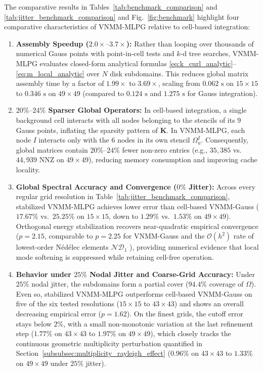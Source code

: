 \documentclass[VANCOUVER,Times1COL]{WileyNJD-v5}
\begin{document}
The comparative results in Tables~\ref{tab:benchmark_comparison} and \ref{tab:jitter_benchmark_comparison} and Fig.~\ref{fig:benchmark} highlight four comparative characteristics of VNMM-MLPG relative to cell-based integration:
\begin{enumerate}
    \item \textbf{Assembly Speedup ($2.0\times\text{--}3.7\times$):} Rather than looping over thousands of numerical Gauss points with point-in-cell tests and $k$-d tree searches, VNMM-MLPG evaluates closed-form analytical formulas \eqref{eq:k_curl_analytic}--\eqref{eq:m_local_analytic} over $N$ disk subdomains. This reduces global matrix assembly time by a factor of $1.99\times$ to $3.69\times$, scaling from $0.062\text{ s}$ on $15 \times 15$ to $0.346\text{ s}$ on $49 \times 49$ (compared to $0.124\text{ s}$ and $1.275\text{ s}$ for Gauss integration).
    \item \textbf{$20\%\text{--}24\%$ Sparser Global Operators:} In cell-based integration, a single background cell interacts with all nodes belonging to the stencils of its 9 Gauss points, inflating the sparsity pattern of $\mathbf{K}$. In VNMM-MLPG, each node $I$ interacts only with the 6 nodes in its own stencil $\Omega_u^I$. Consequently, global matrices contain $20\%\text{--}24\%$ fewer non-zero entries (e.g., $35,385$ vs. $44,939$ NNZ on $49 \times 49$), reducing memory consumption and improving cache locality.
    \item \textbf{Global Spectral Accuracy and Convergence ($0\%$ Jitter):} Across every regular grid resolution in Table~\ref{tab:jitter_benchmark_comparison}, stabilized VNMM-MLPG achieves lower error than cell-based VNMM-Gauss ($17.67\%$ vs.\ $25.25\%$ on $15\times 15$, down to $1.29\%$ vs.\ $1.53\%$ on $49\times 49$). Orthogonal energy stabilization recovers near-quadratic empirical convergence ($p = 2.15$, comparable to $p = 2.25$ for VNMM-Gauss and the $\mathcal{O}(h^2)$ rate of lowest-order N\'{e}d\'{e}lec elements $\mathcal{ND}_1$ \cite{nedelec1980mixed, monk2003finite}), providing numerical evidence that local mode softening is suppressed while retaining cell-free operation.
    \item \textbf{Behavior under $25\%$ Nodal Jitter and Coarse-Grid Accuracy:} Under $25\%$ nodal jitter, the subdomains form a partial cover ($94.4\%$ coverage of $\Omega$). Even so, stabilized VNMM-MLPG outperforms cell-based VNMM-Gauss on five of the six tested resolutions ($15\times 15$ to $43\times 43$) and shows an overall decreasing empirical error ($p = 1.62$). On the finest grids, the cutoff error stays below $2\%$, with a small non-monotonic variation at the last refinement step ($1.77\%$ on $43\times 43$ to $1.97\%$ on $49\times 49$), which closely tracks the continuous geometric multiplicity perturbation quantified in Section~\ref{subsubsec:multiplicity_rayleigh_effect} ($0.96\%$ on $43\times 43$ to $1.33\%$ on $49\times 49$ under $25\%$ jitter). 
    

\end{enumerate}
\end{document}
